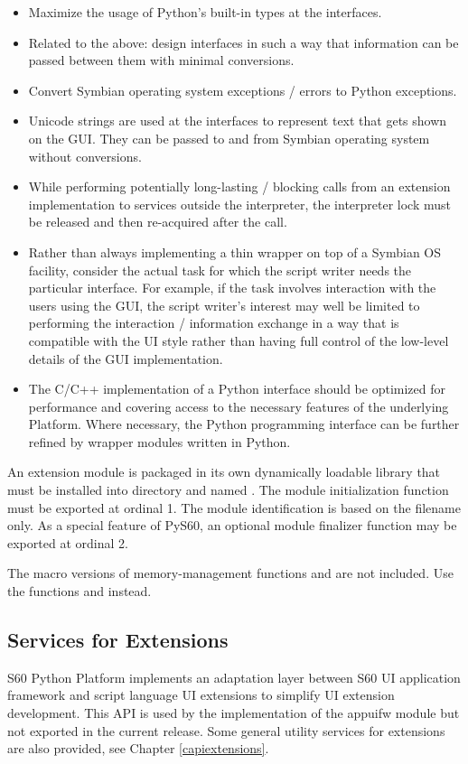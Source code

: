 \begin{itemize}
\item Maximize the usage of Python's built-in types at the interfaces.
\item Related to the above: design interfaces in such a way that information can be passed between them with minimal conversions.
\item Convert Symbian operating system exceptions / errors to Python exceptions.
\item Unicode strings are used at the interfaces to represent text that gets shown on the GUI. They can be passed to and from Symbian operating system without conversions.
\item While performing potentially long-lasting / blocking calls from an extension implementation to services outside the interpreter, the interpreter lock must be released and then re-acquired after the call.
\item Rather than always implementing a thin wrapper on top of a Symbian OS facility, consider the actual task for which the script writer needs the particular interface. For example, if the task involves interaction with the users using the GUI, the script writer's interest may well be limited to performing the interaction / information exchange in a way that is compatible with the UI style rather than having full control of the low-level details of the GUI implementation.
\item The C/C++ implementation of a Python interface should be optimized for performance and covering access to the necessary features of the underlying Platform. Where necessary, the Python programming interface can be further refined by wrapper modules written in Python.
\end{itemize}

An extension module is packaged in its own dynamically loadable
library that must be installed into  directory and named
. The module initialization function
must be exported at ordinal 1. The module identification is based on
the filename only. As a special feature of PyS60, an optional module
finalizer function may be exported at ordinal 2.

The macro versions of memory-management functions  
and  are not included. Use the functions 
 and  instead.

\subsection{Services for Extensions}
S60 Python Platform implements an adaptation layer between S60 
UI application framework and script language UI extensions to simplify UI 
extension development. This API is used by the implementation of the 
\textsf{appuifw} module but not exported in the current release. Some 
general utility services for extensions are also provided, see 
Chapter \ref{capiextensions}.

